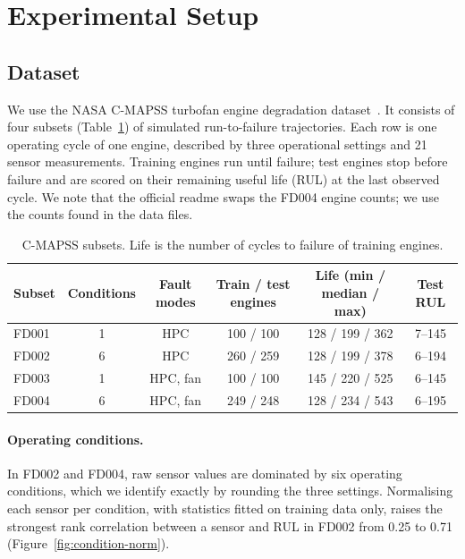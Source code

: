 \section{Experimental Setup}
\label{sec:experiments}

\subsection{Dataset}
\label{sec:dataset}

We use the NASA C-MAPSS turbofan engine degradation dataset~\citep{saxena2008damage}. It consists
of four subsets (Table~\ref{tab:cmapss}) of simulated run-to-failure trajectories. Each row is one
operating cycle of one engine, described by three operational settings and 21 sensor
measurements. Training engines run until failure; test engines stop before failure and are scored
on their remaining useful life (RUL) at the last observed cycle. We note that the official readme
swaps the FD004 engine counts; we use the counts found in the data files.

\begin{table}[ht]
  \centering
  \caption{C-MAPSS subsets. Life is the number of cycles to failure of training engines.}
  \label{tab:cmapss}
  \begin{tabular}{lccccc}
    \toprule
    Subset & Conditions & Fault modes & Train / test engines & Life (min / median / max) & Test RUL \\
    \midrule
    FD001 & 1 & HPC      & 100 / 100 & 128 / 199 / 362 & 7--145 \\
    FD002 & 6 & HPC      & 260 / 259 & 128 / 199 / 378 & 6--194 \\
    FD003 & 1 & HPC, fan & 100 / 100 & 145 / 220 / 525 & 6--145 \\
    FD004 & 6 & HPC, fan & 249 / 248 & 128 / 234 / 543 & 6--195 \\
    \bottomrule
  \end{tabular}
\end{table}

\paragraph{Operating conditions.} In FD002 and FD004, raw sensor values are dominated by six
operating conditions, which we identify exactly by rounding the three settings. Normalising each
sensor per condition, with statistics fitted on training data only, raises the strongest rank
correlation between a sensor and RUL in FD002 from 0.25 to 0.71
(Figure~\ref{fig:condition-norm}).

